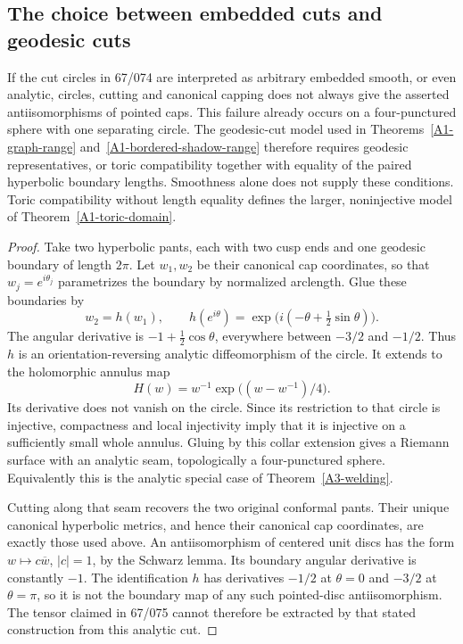 \subsection{The choice between embedded cuts and geodesic cuts}
\label{sec:A1-cut-choice}

\begin{proposition}
\label{A1-nontoric-cut}
If the cut circles in 67/074 are interpreted as arbitrary embedded
smooth, or even analytic, circles, cutting and canonical capping
does not always give the asserted antiisomorphisms of pointed caps.
This failure already occurs on a four-punctured sphere with one
separating circle. The geodesic-cut model used in
Theorems~\ref{A1-graph-range} and~\ref{A1-bordered-shadow-range}
therefore requires geodesic representatives, or toric compatibility
together with equality of the paired hyperbolic boundary lengths.
Smoothness alone does not supply these conditions. Toric compatibility
without length equality defines the larger, noninjective model of
Theorem~\ref{A1-toric-domain}.
\end{proposition}
\begin{proof}
Take two hyperbolic pants, each with two cusp ends and one
geodesic boundary of length $2\pi$. Let $w_1,w_2$ be their canonical
cap coordinates, so that $w_j=e^{i\theta_j}$ parametrizes the
boundary by normalized arclength. Glue these boundaries by
\[
 w_2=h(w_1),\qquad
 h(e^{i\theta})=
       \exp\bigl(i(-\theta+\tfrac12\sin\theta)\bigr).
\]
The angular derivative is $-1+\tfrac12\cos\theta$, everywhere
between $-3/2$ and $-1/2$. Thus $h$ is an orientation-reversing
analytic diffeomorphism of the circle. It extends to the holomorphic
annulus map
\[
 H(w)=w^{-1}\exp\bigl((w-w^{-1})/4\bigr).
\]
Its derivative does not vanish on the circle. Since its restriction
to that circle is injective, compactness and local injectivity imply
that it is injective on a sufficiently small whole annulus. Gluing by
this collar extension gives a Riemann surface with an analytic
seam, topologically a four-punctured sphere. Equivalently this
is the analytic special case of Theorem~\ref{A3-welding}.

Cutting along that seam recovers the two original conformal
pants. Their unique canonical hyperbolic metrics, and hence their
canonical cap coordinates, are exactly those used above. An
antiisomorphism of centered unit discs has the form
$w\mapsto c\overline w$, $|c|=1$, by the Schwarz lemma. Its boundary
angular derivative is constantly $-1$. The identification $h$
has derivatives $-1/2$ at $\theta=0$ and $-3/2$ at $\theta=\pi$,
so it is not the boundary map of any such pointed-disc
antiisomorphism. The tensor claimed in 67/075 cannot therefore
be extracted by that stated construction from this analytic cut.
\end{proof}

